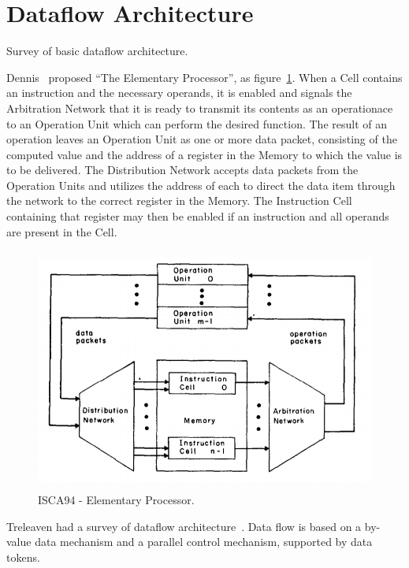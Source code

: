 \documentclass[UTF8]{article}
\begin{document}
\section{Dataflow Architecture}
\label{sec:dataflow_arch}
Survey of basic dataflow architecture.

Dennis~\cite{DBLP:conf/isca/DennisM74} proposed ``The Elementary Processor'',
as figure~\ref{fig:elementory_processor}.
When a Cell contains an instruction and the necessary operands,
it is enabled and signals the Arbitration Network
that it is ready to transmit its contents as an operationace
to an Operation Unit which can perform the desired function.
The result of an operation leaves an Operation Unit
as one or more data packet,
consisting of the computed value and the address of a register
in the Memory to which the value is to be delivered.
The Distribution Network accepts data packets
from the Operation Units and utilizes the address of each
to direct the data item through the network to the correct register in the Memory.
The Instruction Cell containing that register may then be enabled
if an instruction and all operands are present in the Cell.

\begin{figure}[htb]
  \begin{small}
    \begin{center}
      \includegraphics[width=\textwidth,height=8cm]{figures/isca94_elementory_processor.png}
    \end{center}
    \caption{ISCA94 - Elementary Processor.}
    \label{fig:elementory_processor}
  \end{small}
\end{figure}

Treleaven had a survey of dataflow architecture~\cite{DBLP:journals/csur/TreleavenBH82}.
Data flow is based on a by-value data mechanism
and a parallel control mechanism, supported by data tokens. 
\end{document}
